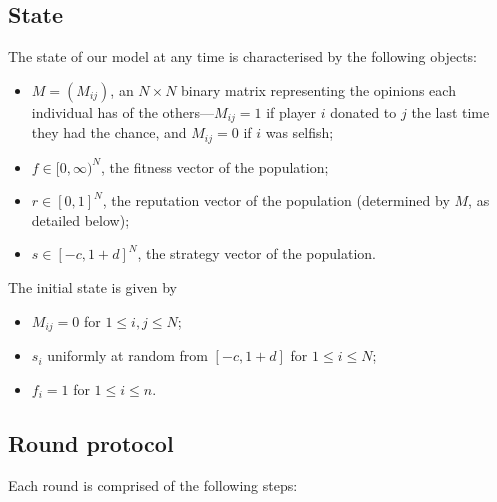 \documentclass{amsart}
\begin{document}
\subsection{State}
\label{subsection-state}

The state of our model at any time is characterised by the following
objects: 
\begin{itemize}
\item $M = (M_{ij})$, an $N \times N$ binary matrix representing the
  opinions each individual has of the others---$M_{ij} = 1$ if player
  $i$ donated to $j$ the last time they had the chance, and $M_{ij} =
  0$ if $i$ was selfish;
\item $f \in [0, \infty)^N$, the fitness vector of the population;
\item $r \in [0,1]^N$, the reputation vector of the population
  (determined by $M$, as detailed below);
\item $s \in [-c,1+d]^N$, the strategy vector of the population.
\end{itemize}
The initial state is given by
\begin{itemize}
\item $M_{ij} = 0$ for $1 \le i,j \le N$;
\item $s_i$ uniformly at random from $[-c,1+d]$ for $1 \le i \le N$;
\item $f_i = 1$ for $1 \le i \le n$.
\end{itemize}

\subsection{Round protocol}
\label{subsection-round}

Each round is comprised of the following steps:
\end{document}
